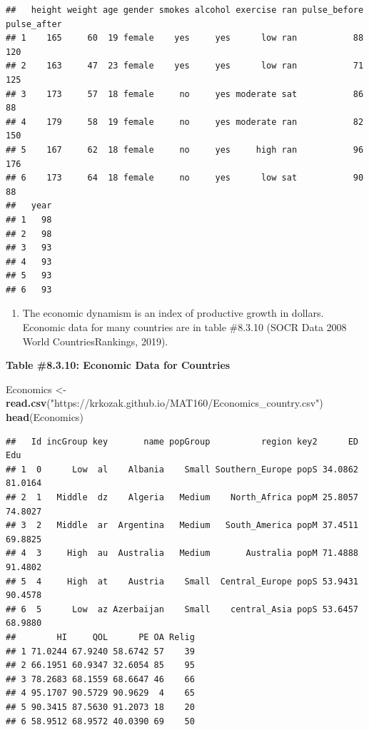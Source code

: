 \documentclass[
]{book}
\newenvironment{Shaded}{\begin{snugshade}}{\end{snugshade}}
\newcommand{\KeywordTok}[1]{\textcolor[rgb]{0.13,0.29,0.53}{\textbf{#1}}}
\newcommand{\NormalTok}[1]{#1}
\newcommand{\StringTok}[1]{\textcolor[rgb]{0.31,0.60,0.02}{#1}}
\providecommand{\tightlist}{%
  \setlength{\itemsep}{0pt}\setlength{\parskip}{0pt}}
\begin{document}
\begin{verbatim}
##   height weight age gender smokes alcohol exercise ran pulse_before pulse_after
## 1    165     60  19 female    yes     yes      low ran           88         120
## 2    163     47  23 female    yes     yes      low ran           71         125
## 3    173     57  18 female     no     yes moderate sat           86          88
## 4    179     58  19 female     no     yes moderate ran           82         150
## 5    167     62  18 female     no     yes     high ran           96         176
## 6    173     64  18 female     no     yes      low sat           90          88
##   year
## 1   98
## 2   98
## 3   93
## 4   93
## 5   93
## 6   93
\end{verbatim}

\begin{enumerate}
\def\labelenumi{\arabic{enumi}.}
\setcounter{enumi}{4}
\tightlist
\item
  The economic dynamism is an index of productive growth in dollars. Economic data for many countries are in table \#8.3.10 (SOCR Data 2008 World CountriesRankings, 2019).
\end{enumerate}

\textbf{Table \#8.3.10: Economic Data for Countries}

\begin{Shaded}
\begin{Highlighting}[]
\NormalTok{Economics <-}\StringTok{ }\KeywordTok{read.csv}\NormalTok{(}\StringTok{"https://krkozak.github.io/MAT160/Economics_country.csv"}\NormalTok{)}
\KeywordTok{head}\NormalTok{(Economics)}
\end{Highlighting}
\end{Shaded}

\begin{verbatim}
##   Id incGroup key       name popGroup          region key2      ED     Edu
## 1  0      Low  al    Albania    Small Southern_Europe popS 34.0862 81.0164
## 2  1   Middle  dz    Algeria   Medium    North_Africa popM 25.8057 74.8027
## 3  2   Middle  ar  Argentina   Medium   South_America popM 37.4511 69.8825
## 4  3     High  au  Australia   Medium       Australia popM 71.4888 91.4802
## 5  4     High  at    Austria    Small  Central_Europe popS 53.9431 90.4578
## 6  5      Low  az Azerbaijan    Small    central_Asia popS 53.6457 68.9880
##        HI     QOL      PE OA Relig
## 1 71.0244 67.9240 58.6742 57    39
## 2 66.1951 60.9347 32.6054 85    95
## 3 78.2683 68.1559 68.6647 46    66
## 4 95.1707 90.5729 90.9629  4    65
## 5 90.3415 87.5630 91.2073 18    20
## 6 58.9512 68.9572 40.0390 69    50
\end{verbatim}
\end{document}

